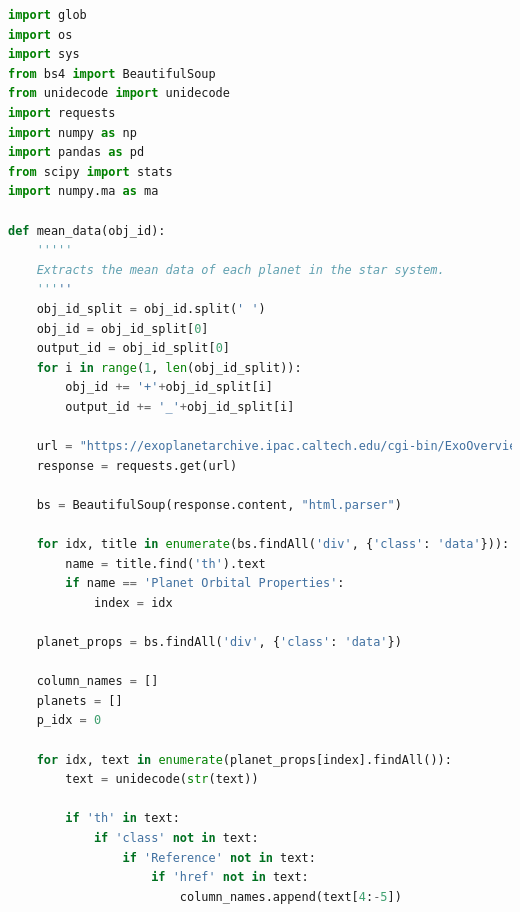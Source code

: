\documentclass[11pt, oneside]{article}   	%
\begin{document}
\begin{lstlisting}[language=Python, caption={Extracting data from \href{https://exoplanetarchive.ipac.caltech.edu/}{Nasa Exoplanet Archive}}]
import glob
import os
import sys
from bs4 import BeautifulSoup
from unidecode import unidecode
import requests
import numpy as np
import pandas as pd
from scipy import stats
import numpy.ma as ma

def mean_data(obj_id):
	'''''
	Extracts the mean data of each planet in the star system.
	'''''
    obj_id_split = obj_id.split(' ')
    obj_id = obj_id_split[0]
    output_id = obj_id_split[0]
    for i in range(1, len(obj_id_split)):
        obj_id += '+'+obj_id_split[i]
        output_id += '_'+obj_id_split[i]

    url = "https://exoplanetarchive.ipac.caltech.edu/cgi-bin/ExoOverview/nph-ExoOverview?objname={}&type=&label&aliases&exo&iden&orb&ppar&tran&note&disc&ospar&ts&nalc&force=&dhxr1507830887922".format(obj_id)
    response = requests.get(url)

    bs = BeautifulSoup(response.content, "html.parser")

    for idx, title in enumerate(bs.findAll('div', {'class': 'data'})):
        name = title.find('th').text
        if name == 'Planet Orbital Properties':
            index = idx

    planet_props = bs.findAll('div', {'class': 'data'})

    column_names = []
    planets = []
    p_idx = 0

    for idx, text in enumerate(planet_props[index].findAll()):
        text = unidecode(str(text))

        if 'th' in text:
            if 'class' not in text:
                if 'Reference' not in text:
                    if 'href' not in text:
                        column_names.append(text[4:-5])


\end{lstlisting}
\end{document}

